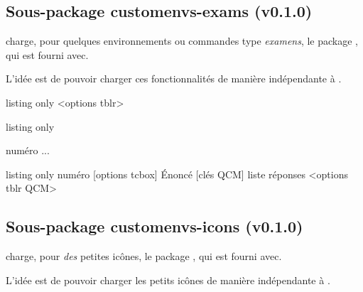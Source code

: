 \documentclass[french,11pt,a4paper]{article}
\begin{document}
\subsection{Sous-package customenvs-exams (v0.1.0)}

 charge, pour quelques environnements ou commandes type \textit{examens}, le package , qui est fourni avec.

L'idée est de pouvoir charger ces fonctionnalités de manière indépendante à .

\begin{DemoCode}{listing only}
%
  <options tblr>
\end{DemoCode}

\begin{DemoCode}{listing only}
\begin{ExamAutomatQuest}{numéro}
...
\end{ExamAutomatQuest}
\end{DemoCode}

\begin{DemoCode}{listing only}
\QuestionAutomatismes%
	{numéro}%
	[options tcbox]%
	{Énoncé}%
	[clés QCM]%
	{liste réponses}%
	<options tblr QCM>%
\end{DemoCode}

\subsection{Sous-package customenvs-icons (v0.1.0)}

 charge, pour \textit{des} petites icônes, le package , qui est fourni avec.

L'idée est de pouvoir charger les petits icônes de manière indépendante à .
\end{document}
